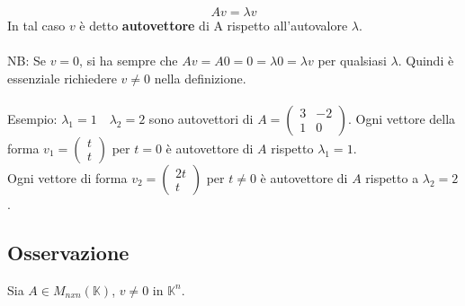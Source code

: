 \documentclass[12pt]{article}
\begin{document}
\[Av =  \lambda v\]
In tal caso $v$ è detto \textbf{autovettore} di A rispetto all'autovalore $\lambda$.
\\\\
NB: Se $v = 0$, si ha sempre che $Av = A0 = 0 = \lambda 0 = \lambda v$ per qualsiasi $\lambda$.
Quindi è essenziale richiedere $v \neq 0$ nella definizione.
\\\\
Esempio:
$\lambda_1 = 1 \quad \lambda_2 = 2$ sono autovettori di $A = \begin{pmatrix}
    3 & -2\\
    1 & 0
\end{pmatrix}$. Ogni vettore della forma $v_1 = \begin{pmatrix}
    t\\
    t
\end{pmatrix}$ per $t = 0$ è autovettore di $A$ rispetto $\lambda_1 = 1$.\\
Ogni vettore di forma $v_2 = \begin{pmatrix}
    2t\\
    t
\end{pmatrix}$ per $t \neq 0$ è autovettore di $A$ rispetto a $\lambda_2 = 2$.

\subsection{Osservazione}

Sia $A \in M_{nxn} (\mathbb{K})$, $v \neq 0$ in $\mathbb{K}^n$.
\end{document}
